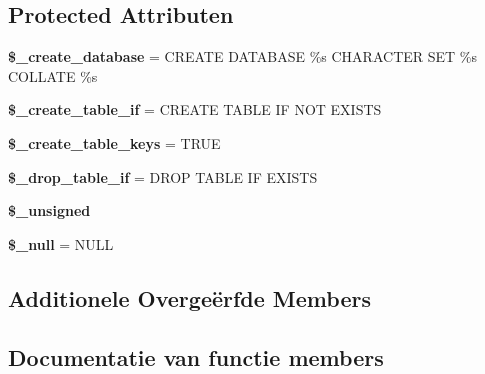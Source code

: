 \subsection*{Protected Attributen}
\begin{DoxyCompactItemize}
\item 
\mbox{\label{class_c_i___d_b__pdo__mysql__forge_acd23c9a8735806155f1a5d0a87c151f2}} 
{\bfseries \$\+\_\+create\+\_\+database} = \textquotesingle{}C\+R\+E\+A\+TE D\+A\+T\+A\+B\+A\+SE \%s C\+H\+A\+R\+A\+C\+T\+ER S\+ET \%s C\+O\+L\+L\+A\+TE \%s\textquotesingle{}
\item 
\mbox{\label{class_c_i___d_b__pdo__mysql__forge_a2f6484fcb8d1dc3eef67a637227cd583}} 
{\bfseries \$\+\_\+create\+\_\+table\+\_\+if} = \textquotesingle{}C\+R\+E\+A\+TE T\+A\+B\+LE IF N\+OT E\+X\+I\+S\+TS\textquotesingle{}
\item 
\mbox{\label{class_c_i___d_b__pdo__mysql__forge_a73e07acdd35c948ad353903c2827af6e}} 
{\bfseries \$\+\_\+create\+\_\+table\+\_\+keys} = T\+R\+UE
\item 
\mbox{\label{class_c_i___d_b__pdo__mysql__forge_a92a8a9145a7fc91e252e58d019373581}} 
{\bfseries \$\+\_\+drop\+\_\+table\+\_\+if} = \textquotesingle{}D\+R\+OP T\+A\+B\+LE IF E\+X\+I\+S\+TS\textquotesingle{}
\item 
{\bfseries \$\+\_\+unsigned}
\item 
\mbox{\label{class_c_i___d_b__pdo__mysql__forge_ae58fe6a5104d4a069a49b27533ce808f}} 
{\bfseries \$\+\_\+null} = \textquotesingle{}N\+U\+LL\textquotesingle{}
\end{DoxyCompactItemize}
\subsection*{Additionele Overge\"{e}rfde Members}


\subsection{Documentatie van functie members}
\mbox{\label{class_c_i___d_b__pdo__mysql__forge_a41c6cae02f2fda8b429ad0afb9509426}} 
